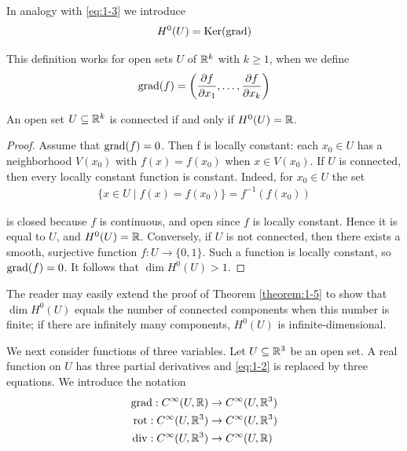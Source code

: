 In analogy with \eqref{eq:1-3} we introduce
\begin{align}\label{eq:1-5}
  H^0(U) = \operatorname{Ker}(\operatorname{grad})
\end{align}

This definition works for open sets $U$ of ${\mathbb{R}}^k$ with $k\ge1$, when we define
\begin{align*}
  \operatorname{grad}(f) = \left(\frac{\partial f}{\partial x_1}, \ldots, \frac{\partial f}{\partial x_k}\right)
\end{align*}

\begin{theorem}\label{theorem:1-5}
  An open set $U\subseteq{\ensuremath{\mathbb{R}}}^k$ is connected if and only if $H^0(U) = {\mathbb{R}}$.
\end{theorem}

\begin{proof}
  Assume that $\operatorname{grad}(f) = 0$. Then f is locally constant: each $x_0\in U$ has
a neighborhood $V(x_0)$ with $f(x) = f(x_0)$ when $x\in V(x_0)$. If $U$ is connected,
then every locally constant function is constant. Indeed, for $x_0\in U$ the set
\begin{align*}
  \{x\in U\mid f(x) = f(x_0)\} = f^{-1}(f(x_0))
\end{align*}

is closed because $f$ is continuous, and open since $f$ is locally constant. Hence
it is equal to $U$, and $H^0(U) = {\mathbb{R}}$. Conversely, if $U$ is not connected, then there
exists a smooth, surjective function $f:U\to \{0, 1\}$. Such a function is locally
constant, so $\operatorname{grad}(f) = 0$. It follows that $\dim H^0(U) > 1$.
\end{proof}

The reader may easily extend the proof of Theorem \ref{theorem:1-5} to show that $\dim H^0(U)$
equals the number of connected components when this number is finite; if there are infinitely many components, $H^0(U)$ is infinite-dimensional.


We next consider functions of three variables. Let $U\subseteq{\ensuremath{\mathbb{R}}}^3$ be an open set. A real
function on $U$ has three partial derivatives and \eqref{eq:1-2} is replaced by three equations.
We introduce the notation
\begin{align*}
  \operatorname{grad}: C^\infty(U, {\mathbb{R}}) & \to C^\infty(U, {\mathbb{R}}^3) \\
  \operatorname{rot}: C^\infty(U, {\mathbb{R}}^3) & \to C^\infty(U, {\mathbb{R}}^3) \\
  \operatorname{div}: C^\infty(U, {\mathbb{R}}^3) & \to C^\infty(U, {\mathbb{R}})
\end{align*}

